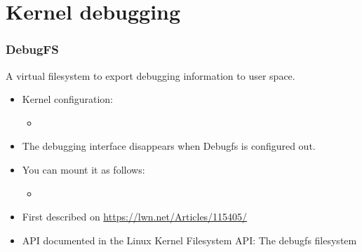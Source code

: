\section{Kernel debugging}



\begin{frame}
  \frametitle{DebugFS}
  A virtual filesystem to export debugging information to user space.
  \begin{itemize}
  \item Kernel configuration: 
    \begin{itemize}
    \item {}
    \end{itemize}
  \item The debugging interface disappears when Debugfs is
    configured out.
  \item You can mount it as follows:
    \begin{itemize}
    \item {}
    \end{itemize}
  \item First described on \url{https://lwn.net/Articles/115405/}
  \item API documented in the Linux Kernel Filesystem API:
    {The debugfs filesystem}
  \end{itemize}
\end{frame}

